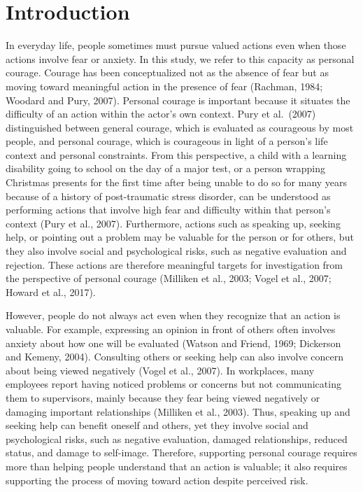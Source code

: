 \documentclass[utf8]{FrontiersinHarvard}
\begin{document}
\section{Introduction}\label{introduction}

In everyday life, people sometimes must pursue valued actions even when those actions involve fear or anxiety. In this study, we refer to this capacity as personal courage. Courage has been conceptualized not as the absence of fear but as moving toward meaningful action in the presence of fear (Rachman, 1984; Woodard and Pury, 2007). Personal courage is important because it situates the difficulty of an action within the actor's own context. Pury et al.~(2007) distinguished between general courage, which is evaluated as courageous by most people, and personal courage, which is courageous in light of a person's life context and personal constraints. From this perspective, a child with a learning disability going to school on the day of a major test, or a person wrapping Christmas presents for the first time after being unable to do so for many years because of a history of post-traumatic stress disorder, can be understood as performing actions that involve high fear and difficulty within that person's context (Pury et al., 2007). Furthermore, actions such as speaking up, seeking help, or pointing out a problem may be valuable for the person or for others, but they also involve social and psychological risks, such as negative evaluation and rejection. These actions are therefore meaningful targets for investigation from the perspective of personal courage (Milliken et al., 2003; Vogel et al., 2007; Howard et al., 2017).

However, people do not always act even when they recognize that an action is valuable. For example, expressing an opinion in front of others often involves anxiety about how one will be evaluated (Watson and Friend, 1969; Dickerson and Kemeny, 2004). Consulting others or seeking help can also involve concern about being viewed negatively (Vogel et al., 2007). In workplaces, many employees report having noticed problems or concerns but not communicating them to supervisors, mainly because they fear being viewed negatively or damaging important relationships (Milliken et al., 2003). Thus, speaking up and seeking help can benefit oneself and others, yet they involve social and psychological risks, such as negative evaluation, damaged relationships, reduced status, and damage to self-image. Therefore, supporting personal courage requires more than helping people understand that an action is valuable; it also requires supporting the process of moving toward action despite perceived risk.
\end{document}
